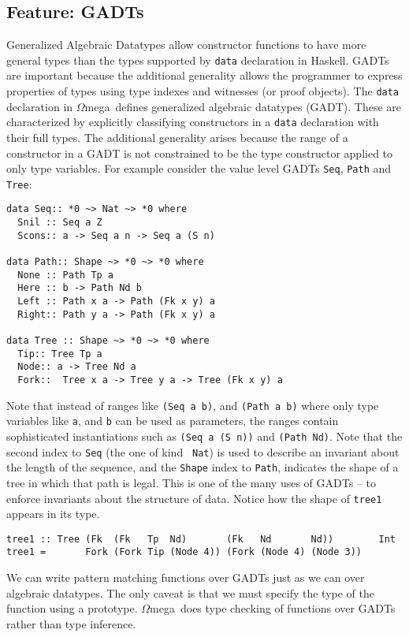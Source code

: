 \documentclass[11pt,twoside,A4]{llncs}
\newcommand{\om}{\emph{$\Omega$}mega}
\begin{document}
\subsection{Feature: GADTs} 
Generalized Algebraic Datatypes allow constructor
functions to have more general types than the types supported by
\verb+data+ declaration in Haskell. GADTs are important because the
additional generality allows the programmer to express properties 
of types using type indexes and witnesses (or proof objects). 
The {\tt data} declaration in \om\ defines generalized algebraic datatypes
(GADT). These are characterized by explicitly classifying constructors in a {\tt data}
declaration with their full types. The additional generality arises because
the range of a constructor in a GADT is not constrained to be the type
constructor applied to only type variables. For example consider the value
level GADTs {\tt Seq}, {\tt Path} and {\tt Tree}:

{\small
\begin{verbatim}
data Seq:: *0 ~> Nat ~> *0 where
  Snil :: Seq a Z
  Scons:: a -> Seq a n -> Seq a (S n)

data Path:: Shape ~> *0 ~> *0 where
  None :: Path Tp a
  Here :: b -> Path Nd b
  Left :: Path x a -> Path (Fk x y) a
  Right:: Path y a -> Path (Fk x y) a
  
data Tree :: Shape ~> *0 ~> *0 where
  Tip:: Tree Tp a
  Node:: a -> Tree Nd a
  Fork::  Tree x a -> Tree y a -> Tree (Fk x y) a
\end{verbatim}}

\noindent
Note that instead of ranges like {\tt (Seq a b)}, and {\tt (Path a b)} where
only type variables like {\tt a}, and {\tt b} can be used as parameters, the
ranges contain sophisticated instantiations such as 
{\tt (Seq a (S n))} and {\tt (Path Nd)}. Note that the second index to {\tt Seq} (the one of kind {\tt
Nat}) is used to describe an invariant about the length of the sequence,
and the {\tt Shape} index to {\tt Path}, indicates the shape of a tree
in which that path is legal. This is one of the many uses of GADTs --
to enforce invariants about the structure of data.
Notice how the shape of {\tt tree1} appears in its type.
{\small
\begin{verbatim}
tree1 :: Tree (Fk  (Fk   Tp  Nd)       (Fk   Nd       Nd))        Int
tree1 =       Fork (Fork Tip (Node 4)) (Fork (Node 4) (Node 3))
\end{verbatim}}
\noindent
We can write pattern matching functions
over GADTs just as we can over algebraic datatypes. The only caveat
is that we must specify the type of the function using a prototype.
\om\ does type checking of functions over GADTs rather than type inference.
\end{document}
